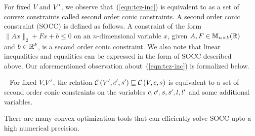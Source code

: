 For fixed $V$ and $V^\prime$, we observe that~(\ref{eqn:tcz-inc}) is
equivalent to as a set of convex constraints called second order
conic constraints.  A second order conic constraint (SOCC)
is defined as follows.
%
A constraint of the form $\|Ax\|_{2}+Fx+b\leq 0$ on an $n$-dimensional
variable $x$, given $A,F\in\mathbb{M}_{n\times k}(\mathbb{\mathbb{R}})$ and $b\in\mathbb{R}^k$, is
a second order conic constraint.
%
We also note that linear inequalities and equalities can be expressed
in the form of SOCC described above.  Our aforementioned observation
about~(\ref{eqn:tcz-inc}) is formalized below.
%
\begin{proposition}~\label{lem:zon-socc}
For fixed $V$,$V^\prime$, the relation
$\mathcal{C}\left(V^\prime,c^\prime,s^\prime\right)\sqsubseteq \mathcal{C}\left(V,c,s\right)$ is equivalent to a set
of second order conic constraints on the variables
$c,c^\prime,s,s^\prime,l,l^\prime$ and some additional variables.
\end{proposition}
%
There are many convex optimization tools that can efficiently solve
SOCC upto a high numerical precision.  
